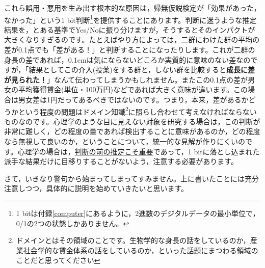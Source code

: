 \documentclass{ltjsbook}
\begin{document}
これら誤用・悪用を生み出す根本的な原因は，帰無仮説検定が「効果があった，なかった」という1 bit判断\footnote{1 bitは付録\ref{computer}にあるように，2進数のデジタルデータの最小単位で，0/1の2つの状態しかありません。}を提供することにあります。判断に迷うような推定結果を，とある基準でYes/Noに振り分けますが，そうするとそのインパクトが大きくなりすぎるのです。たとえばやり方によっては，二群にわけた群の平均の差が0.1点でも「差がある！」と判断することになったりします。これが二群の身長の差であれば，0.1cmは気にならないどころか実質的に意味のない差なのですが，「結果としてこの介入(投薬)をする群と，しない群を比較すると\textbf{成長に差が見られた！}」なんて伝わってしまうかもしれません。またこの0.1点の差が男女の平均獲得賃金(単位・100万円)などであれば大きく意味が違います。この場合は男女差は1円だってあるべきではないのです。つまり，本来，差があるかどうかという程度の問題はドメイン知識\footnote{ドメインとはその領域のことです。生物学的な身長の話をしているのか，産業社会学的な賃金体系の話をしているのか，といった話題にまつわる領域のことだと思ってください}に照らし合わせて考えなければならないものなのです。心理学のような目に見えない対象を研究する場合は，この判断が非常に難しく，どの程度の量であれば検出することに意味があるのか，どの程度なら無視して良いのか，ということについて，統一的な見解が作りにくいのです。心理学の場合は，\underline{判断の前の推定こそ重要}であって，1 bitに落とし込まれた派手な結果だけに目移りすることがないよう，注意する必要があります。


さて，いきなり警句から始まってしまってすみません。上に書いたことには充分注意しつつ，具体的に説明を始めていきたいと思います。

\end{document}
